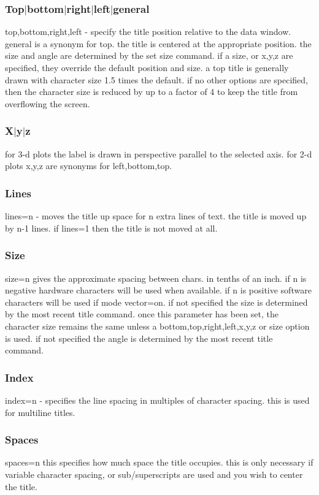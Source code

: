 \subsubsection{Top$|$bottom$|$right$|$left$|$general}
top,bottom,right,left - specify the title position relative to the data
window.  general is a synonym for top.  the title is  centered  at  the
appropriate  position.   the  size  and angle are determined by the set
size command.  if a size, or x,y,z are  specified,  they  override  the
default  position  and  size.   a  top  title  is  generally drawn with
character size  1.5  times  the  default.   if  no  other  options  are
specified, then the character size is reduced by up to a factor of 4 to
keep the title from overflowing the screen.  
\subsubsection{X$|$y$|$z}
for  3-d  plots  the  label  is  drawn  in  perspective parallel to the
selected axis.  for 2-d plots x,y,z are synonyms for left,bottom,top.  
\subsubsection{Lines}
lines=n  -  moves  the  title  up space for n extra lines of text.  the
title is moved up by n-1 lines.  if lines=1 then the title is not moved
at all.  
\subsubsection{Size}
size=n  gives  the  approximate spacing between chars.  in tenths of an
inch.   if  n  is  negative  hardware  characters  will  be  used  when
available.   if  n is positive software characters will be used if mode
vector=on.  if not specified the size is determined by the most  recent
title  command.   once  this parameter has been set, the character size
remains the same unless a bottom,top,right,left,x,y,z or size option is
used.   if  not  specified  the  angle is determined by the most recent
title command.  
\subsubsection{Index}
index=n - specifies the line spacing in multiples of character spacing.
this is used for multiline titles.  
\subsubsection{Spaces}
spaces=n  this  specifies  how  much space the title occupies.  this is
only necessary if variable character spacing, or  sub/superscripts  are
used and you wish to center the title.  

